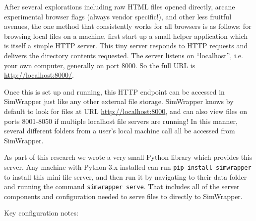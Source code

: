 After several explorations including raw HTML files opened directly, arcane experimental browser flags (always vendor specific!), and other less fruitful avenues, the one method that consistently works for all browsers is as follows: for browsing local files on a machine, first start up a small helper application which is itself a simple HTTP server. This tiny server responds to HTTP requests and delivers the directory contents requested. The server listens on ``localhost'', i.e. your own computer, generally on port 8000. So the full URL is \url{http://localhost:8000/}.

Once this is set up and running, this HTTP endpoint can be accessed in SimWrapper just like any other external file storage. SimWrapper knows by default to look for files at URL \url{http://localhost:8000}, and can also view files on ports 8001-8050 if multiple localhost file servers are running! In this manner, several different folders from a user's local machine call all be accessed from SimWrapper.

As part of this research we wrote a very small Python library which provides this server. Any machine with Python 3.x installed can run \texttt{pip\ install\ simwrapper} to install this mini file server, and then run it by navigating to their data folder and running the command \texttt{simwrapper\ serve}. That includes all of the server components and configuration needed to serve files to directly to SimWrapper.

Key configuration notes:

